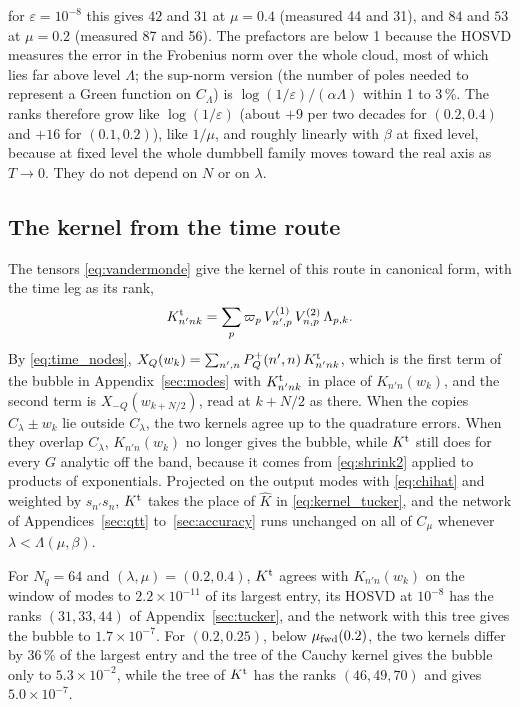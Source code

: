 \documentclass[aps,prb,reprint,a4paper]{revtex4-2}
\begin{document}
for $\varepsilon=10^{-8}$ this gives $42$ and $31$ at $\mu=0.4$ (measured 44 and 31), and $84$ and $53$ at $\mu=0.2$ (measured 87 and 56). The prefactors are below 1 because the HOSVD measures the error in the Frobenius norm over the whole cloud, most of which lies far above level $\Lambda$; the sup-norm version (the number of poles needed to represent a Green function on $C_\Lambda$) is $\log(1/\varepsilon)/(\alpha\Lambda)$ within 1 to 3\,\%. The ranks therefore grow like $\log(1/\varepsilon)$ (about $+9$ per two decades for $(0.2,0.4)$ and $+16$ for $(0.1,0.2)$), like $1/\mu$, and roughly linearly with $\beta$ at fixed level, because at fixed level the whole dumbbell family moves toward the real axis as $T\to0$. They do not depend on $N$ or on $\lambda$.

\subsection{The kernel from the time route}
\label{app:kernel_time}

The tensors \eqref{eq:vandermonde} give the kernel of this route in canonical form, with the time leg as its rank,
\begin{equation}
  K^{\rm t}_{n'nk}=\sum_p\varpi_p\,V^{(1)}_{n',p}\,V^{(2)}_{n,p}\,\Lambda_{p,k}.
  \label{eq:kernel_time}
\end{equation}
By \eqref{eq:time_nodes}, $X_Q(w_k)=\sum_{n',n}P^+_Q(n',n)\,K^{\rm t}_{n'nk}$, which is the first term of the bubble in Appendix~\ref{sec:modes} with $K^{\rm t}_{n'nk}$ in place of $K_{n'n}(w_k)$, and the second term is $X_{-Q}(w_{k+N/2})$, read at $k+N/2$ as there. When the copies $C_\lambda\pm w_k$ lie outside $C_\lambda$, the two kernels agree up to the quadrature errors. When they overlap $C_\lambda$, $K_{n'n}(w_k)$ no longer gives the bubble, while $K^{\rm t}$ still does for every $G$ analytic off the band, because it comes from \eqref{eq:shrink2} applied to products of exponentials. Projected on the output modes with \eqref{eq:chihat} and weighted by $s_{n'}s_n$, $K^{\rm t}$ takes the place of $\widehat K$ in \eqref{eq:kernel_tucker}, and the network of Appendices~\ref{sec:qtt} to~\ref{sec:accuracy} runs unchanged on all of $C_\mu$ whenever $\lambda<\Lambda(\mu,\beta)$.

For $N_q=64$ and $(\lambda,\mu)=(0.2,0.4)$, $K^{\rm t}$ agrees with $K_{n'n}(w_k)$ on the window of modes to $2.2\times10^{-11}$ of its largest entry, its HOSVD at $10^{-8}$ has the ranks $(31,33,44)$ of Appendix~\ref{sec:tucker}, and the network with this tree gives the bubble to $1.7\times10^{-7}$. For $(0.2,0.25)$, below $\mu_{\rm fwd}(0.2)$, the two kernels differ by $36\,\%$ of the largest entry and the tree of the Cauchy kernel gives the bubble only to $5.3\times10^{-2}$, while the tree of $K^{\rm t}$ has the ranks $(46,49,70)$ and gives $5.0\times10^{-7}$.
\end{document}
